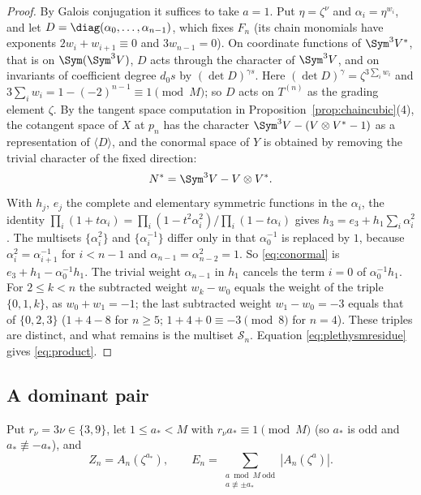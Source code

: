 \begin{proof}
By Galois conjugation it suffices to take $a=1$. Put $\eta=\zeta^\nu$ and
$\alpha_i=\eta^{w_i}$, and let $D=\diag(\alpha_0,\dots,\alpha_{n-1})$, which
fixes $F_n$ (its chain monomials have exponents $2w_i+w_{i+1}\equiv0$ and
$3w_{n-1}=0$). On coordinate functions of $\Sym^3V^*$, that is on
$\Sym(\Sym^3V)$, $D$ acts through the character of $\Sym^3V$, and on invariants
of coefficient degree $d_0s$ by $(\det D)^{\gamma s}$. Here
$(\det D)^\gamma=\zeta^{3\sum_iw_i}$ and $3\sum_iw_i=1-(-2)^{n-1}\equiv1
\pmod M$; so $D$ acts on $T^{(n)}$ as the grading element $\zeta$. By the
tangent space computation in Proposition~\ref{prop:chaincubic}(4), the
cotangent space of $X$ at $p_n$ has the character $\Sym^3V-(V\otimes V^*-1)$
as a representation of $\langle D\rangle$, and the conormal space of $Y$ is
obtained by removing the trivial character of the fixed direction:
\begin{equation}\label{eq:conormal}
 N^*=\Sym^3V-V\otimes V^* .
\end{equation}
With $h_j$, $e_j$ the complete and elementary symmetric functions in the
$\alpha_i$, the identity $\prod_i(1+t\alpha_i)=\prod_i(1-t^2\alpha_i^2)/
\prod_i(1-t\alpha_i)$ gives $h_3=e_3+h_1\sum_i\alpha_i^2$. The multisets
$\{\alpha_i^2\}$ and $\{\alpha_i^{-1}\}$ differ only in that $\alpha_0^{-1}$ is
replaced by $1$, because $\alpha_i^2=\alpha_{i+1}^{-1}$ for $i<n-1$ and
$\alpha_{n-1}=\alpha_{n-2}^2=1$. So \eqref{eq:conormal} is
$e_3+h_1-\alpha_0^{-1}h_1$. The trivial weight $\alpha_{n-1}$ in $h_1$ cancels
the term $i=0$ of $\alpha_0^{-1}h_1$. For $2\le k<n$ the subtracted weight
$w_k-w_0$ equals the weight of the triple $\{0,1,k\}$, as $w_0+w_1=-1$; the
last subtracted weight $w_1-w_0=-3$ equals that of $\{0,2,3\}$ ($1+4-8$ for
$n\ge5$; $1+4+0\equiv-3\pmod8$ for $n=4$). These triples are distinct, and what
remains is the multiset $\mathcal S_n$. Equation \eqref{eq:plethysmresidue}
gives \eqref{eq:product}.
\end{proof}

\subsection{A dominant pair}

Put $r_\nu=3\nu\in\{3,9\}$, let $1\le a_*<M$ with $r_\nu a_*\equiv1\pmod M$
(so $a_*$ is odd and $a_*\not\equiv-a_*$), and
\begin{equation}\label{eq:ZE}
 Z_n=A_n(\zeta^{a_*}),\qquad
 E_n=\sum_{\substack{a\bmod M\ \mathrm{odd}\\a\not\equiv\pm a_*}}|A_n(\zeta^a)| .
\end{equation}

